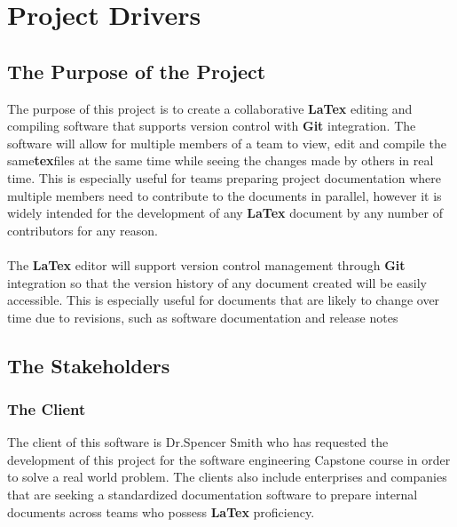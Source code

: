 \documentclass[12pt, titlepage]{article}
\begin{document}
	\section{Project Drivers}
	
	\subsection{The Purpose of the Project}
	
	The purpose of this project is to create a collaborative \textbf{LaTex} editing and compiling software that supports version control with\textbf{ Git }integration. The software will allow for multiple members of a team to view, edit and compile the same\textbf{tex}files at the same time while seeing the changes made by others in real time. This is especially useful for teams preparing project documentation where multiple members need to contribute to the documents in parallel, however it is widely intended for the development of any \textbf{LaTex} document by any number of contributors for any reason.\\
	\\The \textbf{LaTex} editor will support version control management through\textbf{ Git }integration so that the version history of any document created will be easily accessible. This is especially useful for documents that are likely to change over time due to revisions, such as software documentation and release notes
	
	
	\subsection{The Stakeholders}
	
	\subsubsection{The Client}
	
	The client of this software is Dr.Spencer Smith who has requested the development of this project for the software engineering Capstone course in order to solve a real world problem. The clients also include enterprises and companies that are seeking a standardized documentation software to prepare internal documents across teams who possess \textbf{LaTex} proficiency.
	
\end{document}
